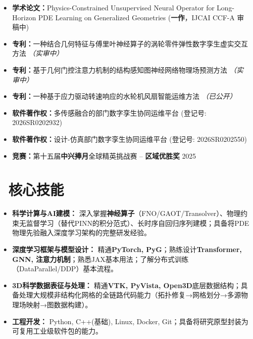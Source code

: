\documentclass[11pt]{article}
\begin{document}
\begin{itemize}
    \item \textbf{学术论文：}Physics-Constrained Unsupervised Neural Operator for Long-Horizon PDE Learning on Generalized Geometries (\textbf{一作}，IJCAI CCF-A 审稿中)
    \item \textbf{专利：}一种结合几何特征与傅里叶神经算子的涡轮零件弹性数字孪生虚实交互方法 \textit{（实审中）}
    \item \textbf{专利：}基于几何门控注意力机制的结构感知图神经网络物理场预测方法 \textit{（实审中）}
    \item \textbf{专利：}一种基于应力驱动转速响应的水轮机风扇智能运维方法 \textit{（已公开）}
    \item \textbf{软件著作权：}多传感融合的部门数字孪生协同运维平台 (登记号: 2026SR0202932)
    \item \textbf{软件著作权：}设计-仿真部门数字孪生协同运维平台 (登记号: 2026SR0202550)
    \item \textbf{竞赛：}第十五届\textbf{中兴捧月}全球精英挑战赛 -- \textbf{区域优胜奖} \hfill 2025
\end{itemize}

  
\section{\makebox[\widthof{\faCogs}][c]{\color{CVBlue}\faCogs}\ 核心技能}
\begin{itemize}
    \item \textbf{科学计算与AI建模：} 深入掌握\textbf{神经算子}（FNO/GAOT/Transolver）、物理约束无监督学习（替代PINN的积分范式）、长时序自回归序列建模；具备将PDE物理先验融入深度学习架构的完整研发经验。
    \item \textbf{深度学习框架与模型设计：} 精通\textbf{PyTorch, PyG}；熟练设计\textbf{Transformer, GNN, 注意力机制}；熟悉JAX基本用法；了解分布式训练（DataParallel/DDP）基本流程。
    \item \textbf{3D科学数据表征与处理：} 精通\textbf{VTK, PyVista, Open3D}底层数据结构；具备处理大规模非结构化网格的全链路代码能力（拓扑修复→网格划分→多源物理场映射→图数据构建）。
    \item \textbf{工程开发：} Python, C++(基础), Linux, Docker, Git；具备将研究原型封装为可复用工业级软件包的能力。
\end{itemize}


\end{document}

